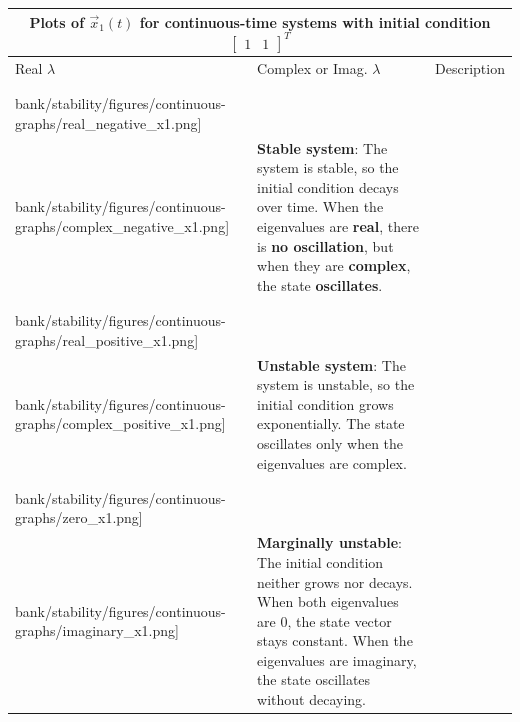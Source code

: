 \begin{tabular}{|p{}| p{}|b{}|}
     \multicolumn{3}{c}{Plots of $\vec{x}_1(t)$ for continuous-time systems with initial condition $\begin{bmatrix} 1 & 1 \end{bmatrix}^T$} \\
    \hline
    Real $\lambda$ & Complex or Imag. $\lambda$ & Description \\
    \hline & & \\
    \texttt{[image: \\bank/stability/figures/continuous-graphs/real\_negative\_x1.png]} &
    \texttt{[image: \\bank/stability/figures/continuous-graphs/complex\_negative\_x1.png]} &
    \textbf{Stable system}: The system is stable, so the initial condition decays over time. When the eigenvalues are \textbf{real}, there is \textbf{no oscillation}, but when they are \textbf{complex}, the state \textbf{oscillates}. \\
    \hline & & \\
    \texttt{[image: \\bank/stability/figures/continuous-graphs/real\_positive\_x1.png]} &
    \texttt{[image: \\bank/stability/figures/continuous-graphs/complex\_positive\_x1.png]} &
    \textbf{Unstable system}: The system is unstable, so the initial condition grows exponentially. The state oscillates only when the eigenvalues are complex. \\
    \hline & & \\
    \texttt{[image: \\bank/stability/figures/continuous-graphs/zero\_x1.png]} &
    \texttt{[image: \\bank/stability/figures/continuous-graphs/imaginary\_x1.png]} &
    \textbf{Marginally unstable}: The initial condition neither grows nor decays. When both eigenvalues are 0, the state vector stays constant. When the eigenvalues are imaginary, the state oscillates without decaying.\\
    \hline
\end{tabular}


